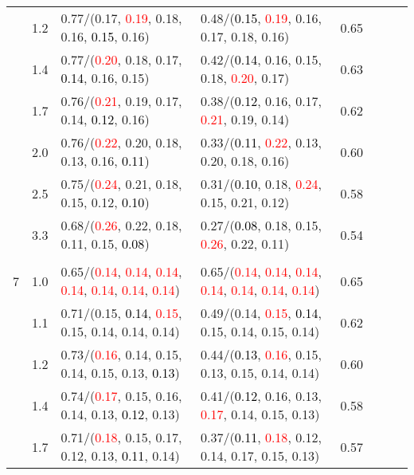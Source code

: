 \documentclass[10pt,a4paper]{report}
\begin{document}
\begin{table}[!htbp]
\begin{center}
{\begin{tabular}{ccllcccc}
			&1.2&0.77/(0.17, \textcolor{red}{0.19}, 0.18, 0.16, \textcolor{black}{0.15}, 0.16)&0.48/(\textcolor{black}{0.15}, \textcolor{red}{0.19}, 0.16, 0.17, 0.18, 0.16)&0.65\\
			&1.4&0.77/(\textcolor{red}{0.20}, 0.18, 0.17, \textcolor{black}{0.14}, 0.16, 0.15)&0.42/(\textcolor{black}{0.14}, 0.16, 0.15, 0.18, \textcolor{red}{0.20}, 0.17)&0.63\\
			&1.7&0.76/(\textcolor{red}{0.21}, 0.19, 0.17, 0.14, \textcolor{black}{0.12}, 0.16)&0.38/(\textcolor{black}{0.12}, 0.16, 0.17, \textcolor{red}{0.21}, 0.19, 0.14)&0.62\\
			&2.0&0.76/(\textcolor{red}{0.22}, 0.20, 0.18, 0.13, 0.16, \textcolor{black}{0.11})&0.33/(\textcolor{black}{0.11}, \textcolor{red}{0.22}, 0.13, 0.20, 0.18, 0.16)&0.60\\
			&2.5&0.75/(\textcolor{red}{0.24}, 0.21, 0.18, 0.15, 0.12, \textcolor{black}{0.10})&0.31/(\textcolor{black}{0.10}, 0.18, \textcolor{red}{0.24}, 0.15, 0.21, 0.12)&0.58\\
			&3.3&0.68/(\textcolor{red}{0.26}, 0.22, 0.18, 0.11, 0.15, \textcolor{black}{0.08})&0.27/(\textcolor{black}{0.08}, 0.18, 0.15, \textcolor{red}{0.26}, 0.22, 0.11)&0.54\\
			&&&&\\
			7			&1.0&0.65/(\textcolor{red}{0.14}, \textcolor{red}{0.14}, \textcolor{red}{0.14}, \textcolor{red}{0.14}, \textcolor{red}{0.14}, \textcolor{red}{0.14}, \textcolor{red}{0.14})&0.65/(\textcolor{red}{0.14}, \textcolor{red}{0.14}, \textcolor{red}{0.14}, \textcolor{red}{0.14}, \textcolor{red}{0.14}, \textcolor{red}{0.14}, \textcolor{red}{0.14})&0.65\\
			&1.1&0.71/(0.15, \textcolor{black}{0.14}, \textcolor{red}{0.15}, 0.15, 0.14, 0.14, 0.14)&0.49/(0.14, \textcolor{red}{0.15}, \textcolor{black}{0.14}, 0.15, 0.14, 0.15, 0.14)&0.62\\
			&1.2&0.73/(\textcolor{red}{0.16}, 0.14, 0.15, 0.14, 0.15, 0.13, \textcolor{black}{0.13})&0.44/(\textcolor{black}{0.13}, \textcolor{red}{0.16}, 0.15, 0.13, 0.15, 0.14, 0.14)&0.60\\
			&1.4&0.74/(\textcolor{red}{0.17}, 0.15, 0.16, 0.14, 0.13, \textcolor{black}{0.12}, 0.13)&0.41/(\textcolor{black}{0.12}, 0.16, 0.13, \textcolor{red}{0.17}, 0.14, 0.15, 0.13)&0.58\\
			&1.7&0.71/(\textcolor{red}{0.18}, 0.15, 0.17, 0.12, 0.13, \textcolor{black}{0.11}, 0.14)&0.37/(\textcolor{black}{0.11}, \textcolor{red}{0.18}, 0.12, 0.14, 0.17, 0.15, 0.13)&0.57\\

\end{tabular}}
\end{center}
\end{table}
\end{document}
